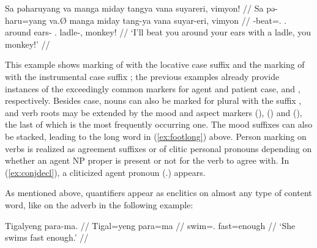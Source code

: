 \ex\label{ex:conjdecl}\begingl
	\gla Sa pəharuyang va manga miday tangya vana suyareri, vimyon! //
	\glb Sa pə-haru=yang va.Ø manga miday tang-ya vana suyar-eri, vimyon //
	\glc \PatT{} \NFut{}-beat=\Fsg{}.\Aarg{} \Ssg{}.\Top{} \Dyn{} around 
		ears-\Loc{} \Ssg{}.\Gen{} ladle-\Ins{}, monkey! //
	\glft `I'll beat you around your ears with a ladle, you monkey!' //
\endgl\xe

This example shows marking of  with the locative case
suffix  and the marking of  with the
instrumental case suffix ; the previous examples already
provide instances of the exceedingly common markers for agent and patient case,
 and , respectively. Besides case, nouns can
also be marked for plural with the suffix , and verb roots may
be extended by the mood and aspect markers  (\Irr{}),
 (\Hab{}) and  (\Neg{}), the last of which is 
the most frequently occurring one. The mood suffixes can also be stacked,
leading to the long word in (\ref{ex:footlong}) above. Person marking on verbs
is realized as agreement suffixes or of clitic personal pronouns depending on
whether an agent NP proper is present or not for the verb to agree with. In
(\ref{ex:conjdecl}), a cliticized agent pronoun 
(\TsgM{}.\Aarg{}) appears.

As mentioned above, quantifiers appear as enclitics on almost any type of 
content word, like on the adverb  in the following example:

\ex
\begingl
	\gla Tigalyeng para-ma. //
	\glb Tigal=yeng para=ma //
	\glc swim=\TsgF{}.\Aarg{} fast=enough //
	\glft `She swims fast enough.' //
\endgl

% 
% 

